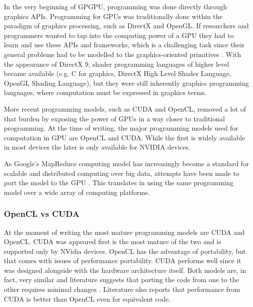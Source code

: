 In the very beginning of GPGPU, programming was done directly through graphics APIs.
Programming for GPUs was traditionally done within the paradigm of graphics processing, such as DirectX and OpenGL.
If researchers and programmers wanted to tap into the computing power of a GPU they had to learn and use these APIs and frameworks, which is a challenging task since their general problems had to be modelled to the graphics-oriented primitives \cite{Misi2012}.
With the appearance of DirectX 9, shader programming languages of higher level became available (e.g. C for graphics, DirectX High Level Shader Language, OpenGL Shading Language), but they were still inherently graphics programming languages, where computation must be expressed in graphics terms. 

More recent programming models, such as CUDA and OpenCL, removed a lot of that burden by exposing the power of GPUs in a way closer to traditional programming.
At the time of writing, the major programming models used for computation in GPU are OpenCL and CUDA.
While the first is widely available in most devices the later is only available for NVIDIA devices.

As Google's MapReduce computing model has increasingly become a standard for scalable and distributed computing over big data, attempts have been made to port the model to the GPU \cite{Ji2011,Xin2012,He2008}.
This translates in using the same programming model over a wide array of computing platforms.


\subsubsection{OpenCL vs CUDA}

At the moment of writing the most mature programming models are CUDA and OpenCL.
CUDA was appeared first is the most mature of the two and is supported only by NVidia devices.
OpenCL has the advantage of portability, but that comes with issues of performance portability.
CUDA performs well since it was designed alongside with the hardware architecture itself.
Both models are, in fact, very similar and literature suggests that porting the code from one to the other requires minimal changes \cite{Karimi2010,Su2012}.
Literature also reports that performance from CUDA is better than OpenCL even for equivalent code.


